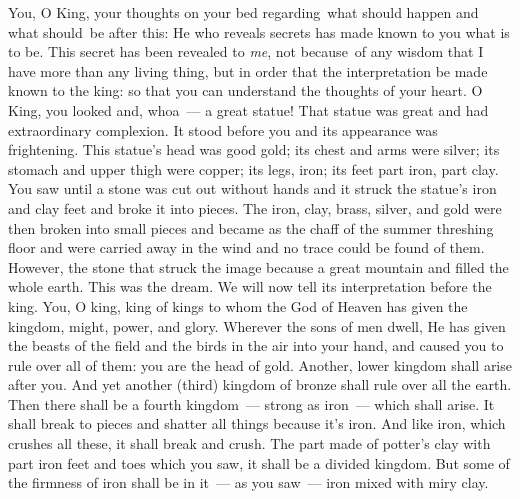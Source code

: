 \begin{inparaenum}
   You, O King, your thoughts on your bed regarding\understood\ what should happen and what should\understood\ be after this: He who reveals secrets has made known to you what is to be.%
   This secret has been revealed to \emph{me}, not because\understood\ of any wisdom that I have more than any living thing, but in order that the interpretation be made known to the king: so that you can understand the thoughts of your heart.%
   O King, you looked and, whoa~--- a great statue! That statue was great and had extraordinary complexion. It stood before you and its appearance was frightening.%
   This statue's head was good gold; its chest and arms were silver; its stomach and upper thigh were copper;%
   its legs, iron; its feet part iron, part clay.%
   You saw until a stone was cut out without hands and it struck the statue's iron and clay feet and broke it into pieces.%
   The iron, clay, brass, silver, and gold were then broken into small pieces and became as the chaff of the summer threshing floor and were carried away in the wind and no trace could be found of them. However, the stone that struck the image because a great mountain and filled the whole earth.%
   This was the dream. We will now tell its interpretation before the king.%
   You, O king, king of kings to whom the God of Heaven has given the kingdom, might, power, and glory.%
   Wherever the sons of men dwell, He has given the beasts of the field and the birds in the air into your hand, and caused you to rule over all of them: you are the head of gold.%
   Another, lower kingdom shall arise after you. And yet another (third) kingdom of bronze shall rule over all the earth.%
   Then there shall be a fourth kingdom~--- strong as iron~--- which shall arise. It shall break to pieces and shatter all things because it's iron. And like iron, which crushes all these, it shall break and crush.%
   The part made of potter's clay with part iron feet and toes which you saw, it shall be a divided kingdom. But some of the firmness of iron shall be in it~--- as you saw~--- iron mixed with miry clay.%

\end{inparaenum}
